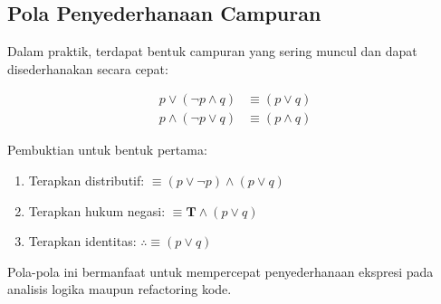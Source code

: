 \subsection{Pola Penyederhanaan Campuran}

Dalam praktik, terdapat bentuk campuran yang sering muncul dan dapat disederhanakan secara cepat:

\begin{align*}
    p \vee (\neg p \wedge q) &\equiv (p \vee q) \\
    p \wedge (\neg p \vee q) &\equiv (p \wedge q)
\end{align*}

Pembuktian untuk bentuk pertama:
\begin{enumerate}
    \item Terapkan distributif: $\equiv (p \vee \neg p) \wedge (p \vee q)$
    \item Terapkan hukum negasi: $\equiv \mathbf{T} \wedge (p \vee q)$
    \item Terapkan identitas: $\therefore \equiv (p \vee q)$
\end{enumerate}
Pola-pola ini bermanfaat untuk mempercepat penyederhanaan ekspresi pada analisis logika maupun refactoring kode.
